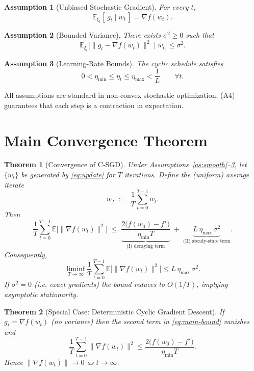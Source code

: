\documentclass[11pt]{article}
\newtheorem{theorem}{Theorem}[section]
\newtheorem{assumption}{Assumption}[section]
\begin{document}
\begin{assumption}[Unbiased Stochastic Gradient]\label{as:unbiased}
For every $t$,
\[
\mathbb{E}_{\xi_t}[\,g_t \mid w_t\,]=\nabla f(w_t).
\tag{A2}
\]
\end{assumption}

\begin{assumption}[Bounded Variance]\label{as:variance}
There exists $\sigma^2\ge0$ such that
\[
\mathbb{E}_{\xi_t}\!\big[\|g_t-\nabla f(w_t)\|^2\mid w_t\big]\le\sigma^2 .
\tag{A3}
\]
\end{assumption}

\begin{assumption}[Learning‑Rate Bounds]\label{as:lr}
The cyclic schedule satisfies
\[
0<\eta_{\min}\le \eta_t\le\eta_{\max}<\frac{1}{L}\qquad\forall t .
\tag{A4}
\]
\end{assumption}

All assumptions are standard in non‑convex stochastic optimization; (A4) guarantees that each step is a contraction in expectation.

\section*{Main Convergence Theorem}
\begin{theorem}[Convergence of C‑SGD]\label{thm:main}
Under Assumptions~\ref{as:smooth}–\ref{as:lr}, let $\{w_t\}$ be generated by \eqref{eq:update} for $T$ iterations.
Define the (uniform) average iterate
\[
\bar w_T \;:=\; \frac{1}{T}\sum_{t=0}^{T-1} w_t .
\]
Then
\begin{equation}
\frac{1}{T}\sum_{t=0}^{T-1}
\mathbb{E}\!\big[\|\nabla f(w_t)\|^2\big]
\;\le\;
\underbrace{\frac{2\big(f(w_0)-f^\star\big)}{\eta_{\min} T}}_{\text{(I) decaying term}}
\;+\;
\underbrace{L\,\eta_{\max}\,\sigma^2}_{\text{(II) steady‑state term}} .
\label{eq:main-bound}
\end{equation}
Consequently,
\[
\liminf_{T\to\infty}\frac{1}{T}\sum_{t=0}^{T-1}
\mathbb{E}\!\big[\|\nabla f(w_t)\|^2\big]\le L\,\eta_{\max}\,\sigma^2 .
\]
If $\sigma^2=0$ (i.e. exact gradients) the bound reduces to $O(1/T)$, implying \emph{asymptotic stationarity}.
\end{theorem}

\begin{theorem}[Special Case: Deterministic Cyclic Gradient Descent]\label{thm:det}
If $g_t=\nabla f(w_t)$ (no variance) then the second term in \eqref{eq:main-bound} vanishes and
\[
\frac{1}{T}\sum_{t=0}^{T-1}\|\nabla f(w_t)\|^2
\le \frac{2\big(f(w_0)-f^\star\big)}{\eta_{\min} T}.
\]
Hence $\|\nabla f(w_t)\|\to0$ as $t\to\infty$.
\end{theorem}
\end{document}
